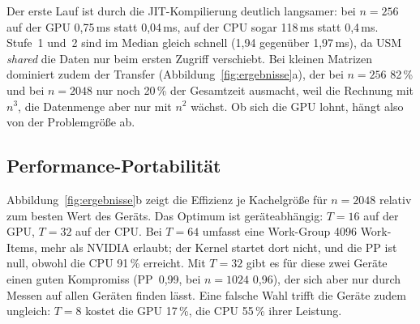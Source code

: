 \documentclass[12pt,a4paper]{article}
\begin{document}
Der erste Lauf ist durch die JIT-Kompilierung deutlich langsamer: bei
$n = 256$ auf der GPU 0,75\,ms statt 0,04\,ms, auf der CPU sogar 118\,ms statt
0,4\,ms. Stufe~1 und~2 sind im Median
gleich schnell (1,94 gegenüber 1,97\,ms), da USM \emph{shared} die Daten nur
beim ersten Zugriff verschiebt.  Bei kleinen Matrizen dominiert
zudem der Transfer (Abbildung~\ref{fig:ergebnisse}a), der bei $n = 256$ 82\,\% und bei $n = 2048$ nur noch
20\,\% der Gesamtzeit ausmacht, weil die Rechnung mit $n^3$, die Datenmenge
aber nur mit $n^2$ wächst. Ob sich die GPU lohnt, hängt also von der
Problemgröße ab.

\subsection{Performance-Portabilität}

Abbildung~\ref{fig:ergebnisse}b zeigt die Effizienz je Kachelgröße für
$n = 2048$ relativ zum besten Wert des Geräts. Das Optimum ist
geräteabhängig: $T = 16$ auf der GPU, $T = 32$ auf der CPU. Bei $T = 64$
umfasst eine Work-Group 4096 Work-Items, mehr als NVIDIA erlaubt; der Kernel
startet dort nicht, und die PP ist null, obwohl die CPU 91\,\% erreicht. Mit
$T = 32$ gibt es für diese zwei Geräte einen guten Kompromiss
(PP~0,99, bei $n = 1024$ 0,96), der sich aber nur durch Messen auf allen
Geräten finden lässt. Eine falsche Wahl trifft die Geräte zudem ungleich:
$T = 8$ kostet die GPU 17\,\%, die CPU 55\,\% ihrer Leistung.
\end{document}
